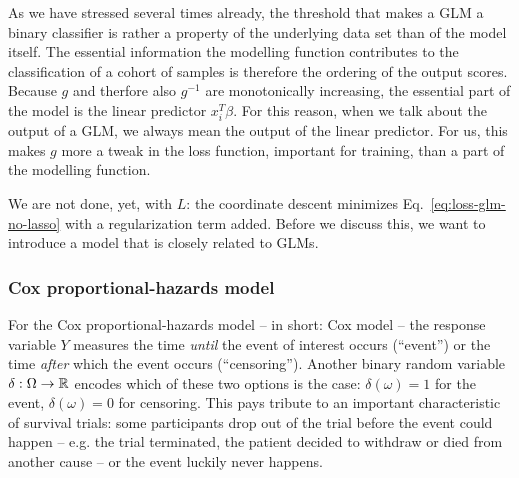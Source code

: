 As we have stressed several times already, the threshold that makes a GLM a binary classifier 
is rather a property of the underlying data set than of the model itself. The essential information 
the modelling function contributes to the classification of a cohort of samples is therefore the 
ordering of the output scores. Because $g$ and therfore also $g^{-1}$ are monotonically increasing, 
the essential part of the model is the linear predictor $x_i^T \beta$. For this reason, when we 
talk about the output of a GLM, we always mean the output of the linear predictor. For us, this 
makes $g$ more a tweak in the loss function, important for training, than a part of the modelling 
function.

We are not done, yet, with $L$: the coordinate descent minimizes 
Eq.\ \eqref{eq:loss-glm-no-lasso} with a regularization term added. Before we discuss this, we want 
to introduce a model that is closely related to GLMs.

\subsubsection{Cox proportional-hazards model}\label{subsubsec:cox}

For the Cox proportional-hazards model -- in short: Cox model -- the response variable $Y$ 
measures the time \textit{until} the event of interest occurs (``event'') or the time 
\textit{after} which the event occurs (``censoring''). Another binary random variable 
$\delta: \Omega \to \mathbb{R}$ encodes 
which of these two options is the case: $\delta(\omega) = 1$ for the event, $\delta(\omega) = 0$ 
for censoring. This pays tribute to an important characteristic of survival trials: some
participants drop out of the trial before the event could happen -- e.g. the trial terminated, the 
patient decided to withdraw or died from another cause -- or the event luckily never happens.

